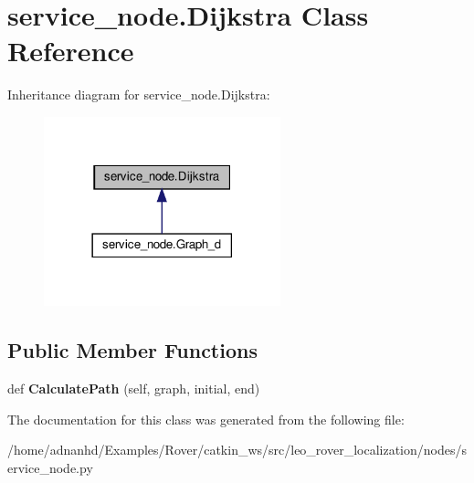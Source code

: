 \hypertarget{classservice__node_1_1Dijkstra}{}\section{service\+\_\+node.\+Dijkstra Class Reference}
\label{classservice__node_1_1Dijkstra}


Inheritance diagram for service\+\_\+node.\+Dijkstra\+:\nopagebreak
\begin{figure}[H]
\begin{center}
\leavevmode
\includegraphics[width=194pt]{classservice__node_1_1Dijkstra__inherit__graph}
\end{center}
\end{figure}
\subsection*{Public Member Functions}
\begin{DoxyCompactItemize}
\item 
\mbox{\label{classservice__node_1_1Dijkstra_a6d1a519973491eca0cdd433a8140035d}} 
def {\bfseries Calculate\+Path} (self, graph, initial, end)
\end{DoxyCompactItemize}


The documentation for this class was generated from the following file\+:\begin{DoxyCompactItemize}
\item 
/home/adnanhd/\+Examples/\+Rover/catkin\+\_\+ws/src/leo\+\_\+rover\+\_\+localization/nodes/service\+\_\+node.\+py\end{DoxyCompactItemize}

